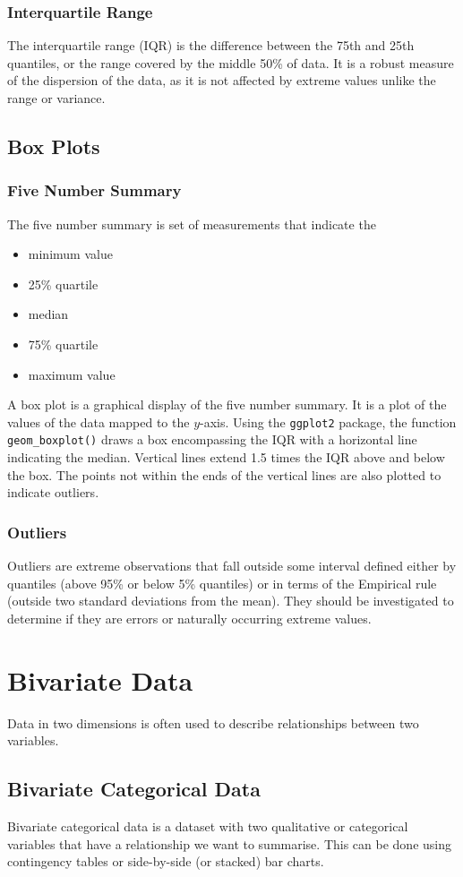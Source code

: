 \documentclass{article}
\begin{document}
\subsubsection{Interquartile Range}
The interquartile range (IQR) is the difference between the 75th and
25th quantiles, or the range covered by the middle 50\% of data. It is
a robust measure of the dispersion of the data, as it is not affected
by extreme values unlike the range or variance.
\subsection{Box Plots}
\subsubsection{Five Number Summary}
The five number summary is set of measurements that indicate the
\begin{itemize}
    \item minimum value
    \item 25\% quartile
    \item median
    \item 75\% quartile
    \item maximum value
\end{itemize}
A box plot is a graphical display of the five number summary.
It is a plot of the values of the data mapped to the \(y\)-axis. Using the \texttt{ggplot2} package, the function
\texttt{geom_boxplot()} draws a box encompassing the IQR with a
horizontal line indicating the median. Vertical lines extend 1.5 times
the IQR above and below the box. The points not within the ends of the
vertical lines are also plotted to indicate outliers.
\subsubsection{Outliers}
Outliers are extreme observations that fall outside some interval
defined either by quantiles (above 95\% or below 5\% quantiles) or in
terms of the Empirical rule (outside two standard deviations from the
mean). They should be investigated to determine if they are errors or
naturally occurring extreme values.
\section{Bivariate Data}
Data in two dimensions is often used to describe relationships between
two variables.
\subsection{Bivariate Categorical Data}
Bivariate categorical data is a dataset with two qualitative or
categorical variables that have a relationship we want to summarise.
This can be done using contingency tables or side-by-side (or stacked)
bar charts.
\end{document}
